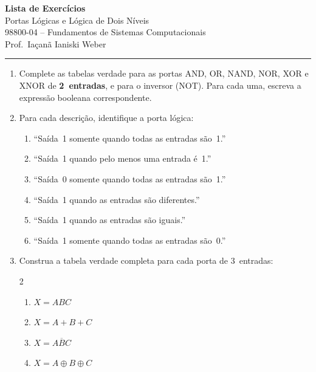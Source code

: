 \documentclass[11pt, a4paper]{article}
\begin{document}
\begin{center}
  {\LARGE \textbf{Lista de Exerc\'{i}cios}}\\[4pt]
  {\Large Portas L\'{o}gicas e L\'{o}gica de Dois N\'{i}veis}\\[6pt]
  {\large 98800-04 -- Fundamentos de Sistemas Computacionais}\\[3pt]
  {\normalsize Prof.\ Ia\c{c}an\~{a} Ianiski Weber}
\end{center}

\vspace{2pt}
\hrule
\vspace{8pt}

\begin{enumerate}

\item Complete as tabelas verdade para as portas AND, OR, NAND, NOR, XOR e XNOR de \textbf{2~entradas}, e para o inversor (NOT). Para cada uma, escreva a express\~{a}o booleana correspondente.

\item Para cada descri\c{c}\~{a}o, identifique a porta l\'{o}gica:
\begin{enumerate}
  \item ``Sa\'{i}da~1 somente quando todas as entradas s\~{a}o~1.''
  \item ``Sa\'{i}da~1 quando pelo menos uma entrada \'{e}~1.''
  \item ``Sa\'{i}da~0 somente quando todas as entradas s\~{a}o~1.''
  \item ``Sa\'{i}da~1 quando as entradas s\~{a}o diferentes.''
  \item ``Sa\'{i}da~1 quando as entradas s\~{a}o iguais.''
  \item ``Sa\'{i}da~1 somente quando todas as entradas s\~{a}o~0.''
\end{enumerate}

\item Construa a tabela verdade completa para cada porta de 3~entradas:
\begin{multicols}{2}
\begin{enumerate}
  \item $X = ABC$
  \item $X = A + B + C$
  \item $X = \overline{ABC}$
  \item $X = A \oplus B \oplus C$
\end{enumerate}
\end{multicols}


\end{enumerate}
\end{document}
